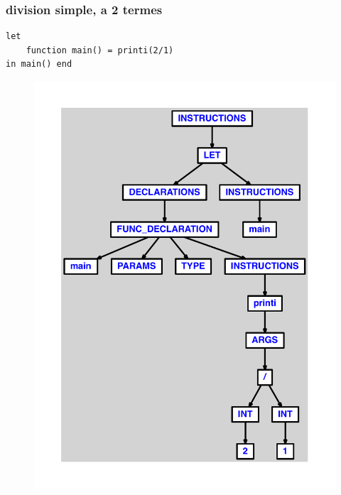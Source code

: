 \documentclass{article}
\begin{document}
\subsubsection{division simple, a 2 termes}
\begin{lstlisting}
let
	function main() = printi(2/1)
in main() end
\end{lstlisting}
\newpage
\begin{figure}[H]
\centering
\includegraphics[max width=\textwidth]{ast/ast_42.pdf}
\end{figure}
\newpage
\end{document}
